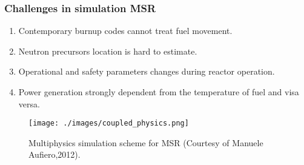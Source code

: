\begin{frame}
  \frametitle{Challenges in simulation \gls{MSR}}
                  \vspace*{-0.05in}
               \begin{enumerate}
                \item Contemporary burnup codes cannot treat fuel movement.
                \item Neutron precursors location is hard to estimate.
                \item Operational and safety parameters changes during reactor operation.
                \item Power generation strongly dependent from the temperature of fuel and visa versa.
               \end{enumerate}

           \begin{figure}[t]
                \vspace*{-0.3in}
			\hspace*{-0.2in}
                \texttt{[image: ./images/coupled\_physics.png]}
		\vspace*{-0.05in}
		\caption{Multiphysics simulation scheme for \gls{MSR} (Courtesy of Manuele Aufiero,2012).}
     	 \end{figure}               
\end{frame}

